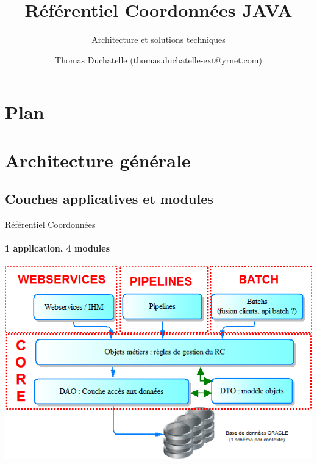 \documentclass[compact]{beamer}%
\title{Référentiel Coordonnées JAVA}
\subtitle{Architecture et solutions techniques}
\author{Thomas Duchatelle (thomas.duchatelle-ext@yrnet.com)}
\institute{Yves Rocher}
\begin{document}
\frame{\titlepage}
  
\section*{Plan}
\frame{\tableofcontents[hideallsubsections]}
	
\section{Architecture générale}

\subsection{Couches applicatives et modules}

\begin{frame}{Référentiel Coordonnées}
	\framesubtitle{1 application, 4 modules}

	\includegraphics[width=\textwidth]{images/rc_arch_general.png}
\end{frame}
\end{document}

